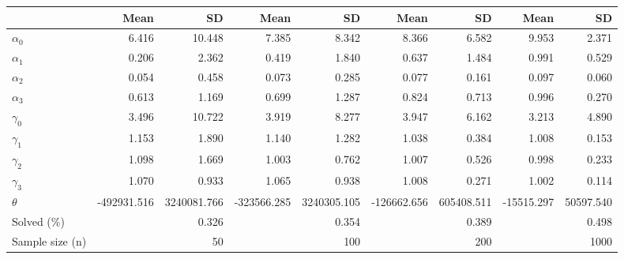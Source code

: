 
\begin{tabular}[t]{lrrrrrrrr}
\toprule
  & Mean & SD & Mean  & SD  & Mean   & SD   & Mean    & SD   \\
\midrule
$\alpha_{0}$ & 6.416 & 10.448 & 7.385 & 8.342 & 8.366 & 6.582 & 9.953 & 2.371\\
$\alpha_{1}$ & 0.206 & 2.362 & 0.419 & 1.840 & 0.637 & 1.484 & 0.991 & 0.529\\
$\alpha_{2}$ & 0.054 & 0.458 & 0.073 & 0.285 & 0.077 & 0.161 & 0.097 & 0.060\\
$\alpha_{3}$ & 0.613 & 1.169 & 0.699 & 1.287 & 0.824 & 0.713 & 0.996 & 0.270\\
$\gamma_{0}$ & 3.496 & 10.722 & 3.919 & 8.277 & 3.947 & 6.162 & 3.213 & 4.890\\
$\gamma_{1}$ & 1.153 & 1.890 & 1.140 & 1.282 & 1.038 & 0.384 & 1.008 & 0.153\\
$\gamma_{2}$ & 1.098 & 1.669 & 1.003 & 0.762 & 1.007 & 0.526 & 0.998 & 0.233\\
$\gamma_{3}$ & 1.070 & 0.933 & 1.065 & 0.938 & 1.008 & 0.271 & 1.002 & 0.114\\
$\theta$ & -492931.516 & 3240081.766 & -323566.285 & 3240305.105 & -126662.656 & 605408.511 & -15515.297 & 50597.540\\
Solved (\%) &  & 0.326 &  & 0.354 &  & 0.389 &  & 0.498\\
Sample size (n) &  & 50 &  & 100 &  & 200 &  & 1000\\
\bottomrule
\end{tabular}
